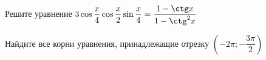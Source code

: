 \begin{ex}
	\begin{condition}
		\begin{enumcols}[label=\asbuk*)]
			\item Решите уравнение \( 3\cos \dfrac{x}{4}\cos \dfrac{x}{2}\sin \dfrac{x}{4} = \dfrac{1 -\ctg x}{1-\ctg^2 x} \)
			\item Найдите все корни уравнения, принадлежащие отрезку \( \left(-2\pi;-\dfrac{3\pi}{2}\right) \)
		\end{enumcols}
	\end{condition}
\end{ex}